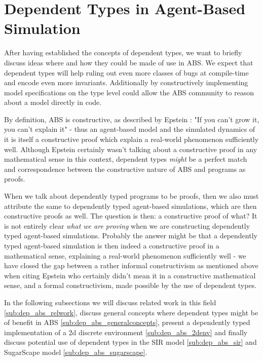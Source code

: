 \section{Dependent Types in Agent-Based Simulation}
\label{sec:dep_absconcepts}

After having established the concepts of dependent types, we want to briefly discuss ideas where and how they could be made of use in ABS. We expect that dependent types will help ruling out even more classes of bugs at compile-time and encode even more invariants. Additionally by constructively implementing model specifications on the type level could allow the ABS community to reason about a model directly in code.

By definition, ABS is constructive, as described by Epstein \cite{epstein_chapter_2006}: "If you can't grow it, you can't explain it" - thus an agent-based model and the simulated dynamics of it is itself a constructive proof which explain a real-world phenomenon sufficiently well. Although Epstein certainly wasn't talking about a constructive proof in any mathematical sense in this context, dependent types \textit{might} be a perfect match and correspondence between the constructive nature of ABS and programs as proofs.

When we talk about dependently typed programs to be proofs, then we also must attribute the same to dependently typed agent-based simulations, which are then constructive proofs as well. The question is then: a constructive proof of what? It is not entirely clear \textit{what we are proving} when we are constructing dependently typed agent-based simulations. Probably the answer might be that a dependently typed agent-based simulation is then indeed a constructive proof in a mathematical sense, explaining a real-world phenomenon sufficiently well - we have closed the gap between a rather informal constructivism as mentioned above when citing Epstein who certainly didn't mean it in a constructive mathematical sense, and a formal constructivism, made possible by the use of dependent types.

In the following subsections we will discuss related work in this field \ref{sub:dep_abs_relwork}, discuss general concepts where dependent types might be of benefit in ABS \ref{sub:dep_abs_generalconcepts}, present a dependently typed implementation of a 2d discrete environment \ref{sub:dep_abs_2denv} and finally discuss potential use of dependent types in the SIR model \ref{sub:dep_abs_sir} and SugarScape model \ref{sub:dep_abs_sugarscape}.

